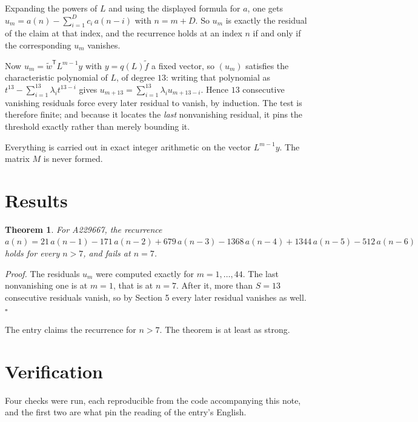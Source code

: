 \documentclass[11pt]{article}
\newtheorem{theorem}{Theorem}
\theoremstyle{definition}
\begin{document}
Expanding the powers of $L$ and using the displayed formula for $a$, one gets $u_m = a(n) - \sum_{i=1}^{D} c_i\,a(n-i)$ with $n = m + D$. So $u_m$ is exactly the residual of the claim at that index, and the recurrence holds at an index $n$ if and only if the corresponding $u_m$ vanishes.

Now $u_m = \tilde w^{\mathsf T} L^{m-1} y$ with $y = q(L)\tilde f$ a fixed vector, so $(u_m)$ satisfies the characteristic polynomial of $L$, of degree $13$: writing that polynomial as $t^{13} - \sum_{i=1}^{13} \lambda_i t^{13-i}$ gives $u_{m+13} = \sum_{i=1}^{13} \lambda_i u_{m+13-i}$. Hence $13$ consecutive vanishing residuals force every later residual to vanish, by induction. The test is therefore finite; and because it locates the {\itshape last} nonvanishing residual, it pins the threshold exactly rather than merely bounding it.

Everything is carried out in exact integer arithmetic on the vector $L^{m-1}y$. The matrix $M$ is never formed.

\section{Results}

\begin{theorem} For A229667, the recurrence $a(n) = 21\,a(n-1) - 171\,a(n-2) + 679\,a(n-3) - 1368\,a(n-4) + 1344\,a(n-5) - 512\,a(n-6)$ holds for every $n > 7$, and fails at $n = 7$.\end{theorem}

{\itshape Proof.} The residuals $u_m$ were computed exactly for $m = 1,\dots,44$. The last nonvanishing one is at $m = 1$, that is at $n = 7$. After it, more than $S = 13$ consecutive residuals vanish, so by Section 5 every later residual vanishes as well. $\square$

The entry claims the recurrence for $n > 7$. The theorem is at least as strong.

\section{Verification}

Four checks were run, each reproducible from the code accompanying this note, and the first two are what pin the reading of the entry's English.
\end{document}
